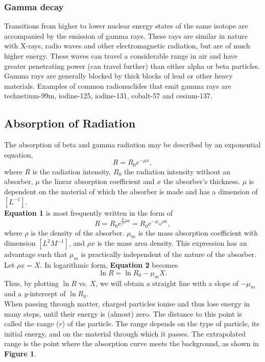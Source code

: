\documentclass[a4paper,11pt]{article}
\begin{document}
\subsubsection*{Gamma decay}
Transitions from higher to lower nuclear energy states of the same isotope are accompanied by the emission of gamma rays. These rays are similar in nature with X-rays, radio waves and other electromagnetic radiation, but are of much higher energy. These waves can travel a considerable range in air and have greater penetrating power (can travel further) than either alpha or beta particles. Gamma rays are generally blocked by thick blocks of lead or other heavy materials. Examples of common radionuclides that emit gamma rays are technetium-99m, iodine-125, iodine-131, cobalt-57 and cesium-137.

\subsection*{Absorption of Radiation}
The absorption of beta and gamma radiation may be described by an exponential equation,
\begin{equation}
R = R_0 e^{-\mu x},
\end{equation}
where $R$ is the radiation intensity, $R_0$ the radiation intensity without an absorber, $\mu$ the linear absorption coefficient and $x$ the absorber’s thickness. $\mu$ is dependent on the material of which the absorber is made and has a dimension of $[L^{-1}]$.\\

\textbf{Equation 1} is most frequently written in the form of
\begin{equation}
R = R_0 e^{\frac{\mu}{\rho}\rho x} = R_0 e^{-\mu_m \rho x},
\end{equation}
where $\rho$ is the density of the absorber. $\mu_m$ is the mass absorption coefficient with dimension $[L^2 M^{-1}]$, and $\rho x$ is the mass area density. This expression has an advantage such that $\mu_m$ is practically independent of the nature of the absorber.\\

Let $\rho x = X$. In logarithmic form, \textbf{Equation 2} becomes
\begin{equation}
\ln R = \ln R_0 - \mu_m X.
\end{equation}
Thus, by plotting $\ln R$ vs. $X$, we will obtain a straight line with a slope of $-\mu_m$ and a $y$-intercept of $\ln R_0$.\\

	When passing through matter, charged particles ionise and thus lose energy in many steps, until their energy is (almost) zero. The distance to this point is called the range ($r$) of the particle. The range depends on the type of particle, its initial energy, and on the material through which it passes. The extrapolated range is the point where the absorption curve meets the background, as shown in \textbf{Figure 1}.
\end{document}
